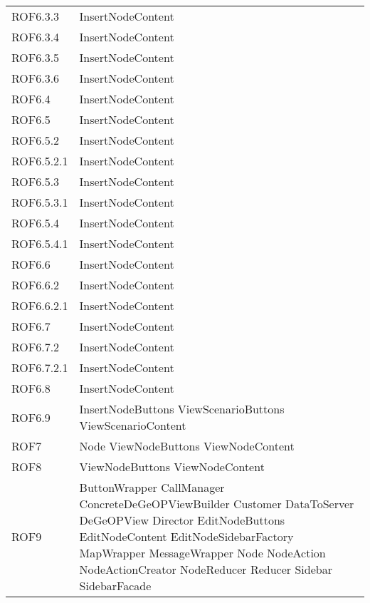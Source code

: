 \begin{longtable}{p{2.5cm}!{\VRule[1pt]}p{5cm}}
		ROF6.3.3 & InsertNodeContent\\
		ROF6.3.4 & InsertNodeContent\\
		ROF6.3.5 & InsertNodeContent\\
		ROF6.3.6 & InsertNodeContent\\
		ROF6.4 & InsertNodeContent\\
		ROF6.5 & InsertNodeContent\\
		ROF6.5.2 & InsertNodeContent\\
		ROF6.5.2.1 & InsertNodeContent\\
		ROF6.5.3 & InsertNodeContent\\
		ROF6.5.3.1 & InsertNodeContent\\
		ROF6.5.4 & InsertNodeContent\\
		ROF6.5.4.1 & InsertNodeContent\\
		ROF6.6 & InsertNodeContent\\
		ROF6.6.2 & InsertNodeContent\\
		ROF6.6.2.1 & InsertNodeContent\\
		ROF6.7 & InsertNodeContent\\
		ROF6.7.2 & InsertNodeContent\\
		ROF6.7.2.1 & InsertNodeContent\\
		ROF6.8 & InsertNodeContent\\
		ROF6.9 & InsertNodeButtons \newline ViewScenarioButtons \newline ViewScenarioContent\\
		ROF7 & Node \newline ViewNodeButtons \newline ViewNodeContent\\
		ROF8 & ViewNodeButtons \newline ViewNodeContent\\
		ROF9 & ButtonWrapper \newline CallManager \newline ConcreteDeGeOPViewBuilder \newline Customer \newline DataToServer \newline DeGeOPView \newline Director \newline EditNodeButtons \newline EditNodeContent \newline EditNodeSidebarFactory \newline MapWrapper \newline MessageWrapper \newline Node \newline NodeAction \newline NodeActionCreator \newline NodeReducer \newline Reducer \newline Sidebar \newline SidebarFacade\\

\end{longtable}
